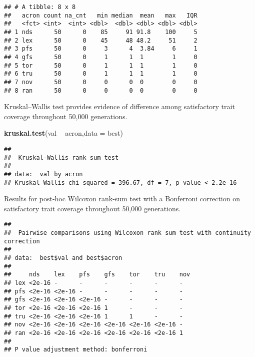 \documentclass[]{book}
\newenvironment{Shaded}{\begin{snugshade}}{\end{snugshade}}
\newcommand{\DataTypeTok}[1]{\textcolor[rgb]{0.13,0.29,0.53}{#1}}
\newcommand{\KeywordTok}[1]{\textcolor[rgb]{0.13,0.29,0.53}{\textbf{#1}}}
\newcommand{\NormalTok}[1]{#1}
\newcommand{\OperatorTok}[1]{\textcolor[rgb]{0.81,0.36,0.00}{\textbf{#1}}}
\newcommand{\OtherTok}[1]{\textcolor[rgb]{0.56,0.35,0.01}{#1}}
\newcommand{\StringTok}[1]{\textcolor[rgb]{0.31,0.60,0.02}{#1}}
\begin{document}
\begin{verbatim}
## # A tibble: 8 x 8
##   acron count na_cnt   min median  mean   max   IQR
##   <fct> <int>  <int> <dbl>  <dbl> <dbl> <dbl> <dbl>
## 1 nds      50      0    85     91 91.8    100     5
## 2 lex      50      0    45     48 48.2     51     2
## 3 pfs      50      0     3      4  3.84     6     1
## 4 gfs      50      0     1      1  1        1     0
## 5 tor      50      0     1      1  1        1     0
## 6 tru      50      0     1      1  1        1     0
## 7 nov      50      0     0      0  0        0     0
## 8 ran      50      0     0      0  0        0     0
\end{verbatim}

Kruskal--Wallis test provides evidence of difference among satisfactory trait coverage throughout 50,000 generations.

\begin{Shaded}
\begin{Highlighting}[]
\KeywordTok{kruskal.test}\NormalTok{(val }\OperatorTok{~}\StringTok{ }\NormalTok{acron,}\DataTypeTok{data =}\NormalTok{ best)}
\end{Highlighting}
\end{Shaded}

\begin{verbatim}
## 
##  Kruskal-Wallis rank sum test
## 
## data:  val by acron
## Kruskal-Wallis chi-squared = 396.67, df = 7, p-value < 2.2e-16
\end{verbatim}

Results for post-hoc Wilcoxon rank-sum test with a Bonferroni correction on satisfactory trait coverage throughout 50,000 generations.

\begin{Shaded}
\end{Shaded}

\begin{verbatim}
## 
##  Pairwise comparisons using Wilcoxon rank sum test with continuity correction 
## 
## data:  best$val and best$acron 
## 
##     nds    lex    pfs    gfs    tor    tru    nov
## lex <2e-16 -      -      -      -      -      -  
## pfs <2e-16 <2e-16 -      -      -      -      -  
## gfs <2e-16 <2e-16 <2e-16 -      -      -      -  
## tor <2e-16 <2e-16 <2e-16 1      -      -      -  
## tru <2e-16 <2e-16 <2e-16 1      1      -      -  
## nov <2e-16 <2e-16 <2e-16 <2e-16 <2e-16 <2e-16 -  
## ran <2e-16 <2e-16 <2e-16 <2e-16 <2e-16 <2e-16 1  
## 
## P value adjustment method: bonferroni
\end{verbatim}
\end{document}
